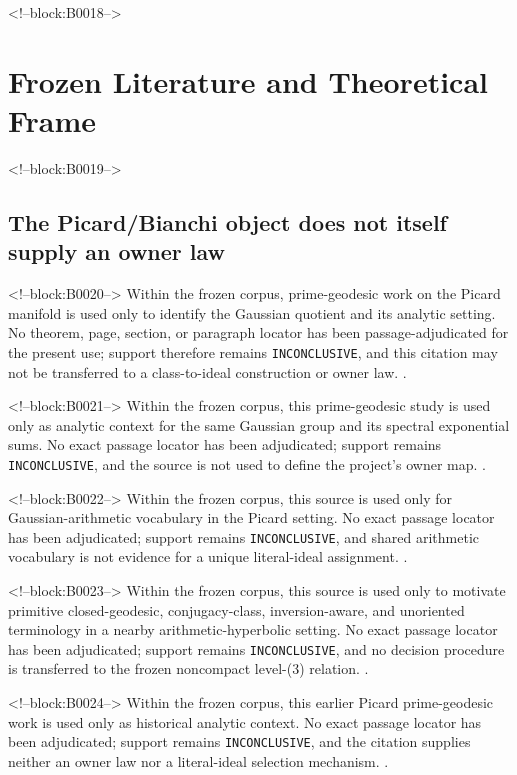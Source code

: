 \documentclass[11pt,a4paper]{article}
\begin{document}
<!--block:B0018-->
\section{Frozen Literature and Theoretical Frame}

<!--block:B0019-->
\subsection{The Picard/Bianchi object does not itself supply an owner law}

<!--block:B0020-->
Within the frozen corpus, prime-geodesic work on the Picard manifold is used only to identify the Gaussian quotient and its analytic setting. No theorem, page, section, or paragraph locator has been passage-adjudicated for the present use; support therefore remains \texttt{INCONCLUSIVE}, and this citation may not be transferred to a class-to-ideal construction or owner law.
\citep{P29-S01}.

<!--block:B0021-->
Within the frozen corpus, this prime-geodesic study is used only as analytic context for the same Gaussian group and its spectral exponential sums. No exact passage locator has been adjudicated; support remains \texttt{INCONCLUSIVE}, and the source is not used to define the project's owner map.
\citep{P29-S02}.

<!--block:B0022-->
Within the frozen corpus, this source is used only for Gaussian-arithmetic vocabulary in the Picard setting. No exact passage locator has been adjudicated; support remains \texttt{INCONCLUSIVE}, and shared arithmetic vocabulary is not evidence for a unique literal-ideal assignment.
\citep{P29-S03}.

<!--block:B0023-->
Within the frozen corpus, this source is used only to motivate primitive closed-geodesic, conjugacy-class, inversion-aware, and unoriented terminology in a nearby arithmetic-hyperbolic setting. No exact passage locator has been adjudicated; support remains \texttt{INCONCLUSIVE}, and no decision procedure is transferred to the frozen noncompact level-(3) relation.
\citep{P29-S08}.

<!--block:B0024-->
Within the frozen corpus, this earlier Picard prime-geodesic work is used only as historical analytic context. No exact passage locator has been adjudicated; support remains \texttt{INCONCLUSIVE}, and the citation supplies neither an owner law nor a literal-ideal selection mechanism.
\citep{P29-S04}.
\end{document}
